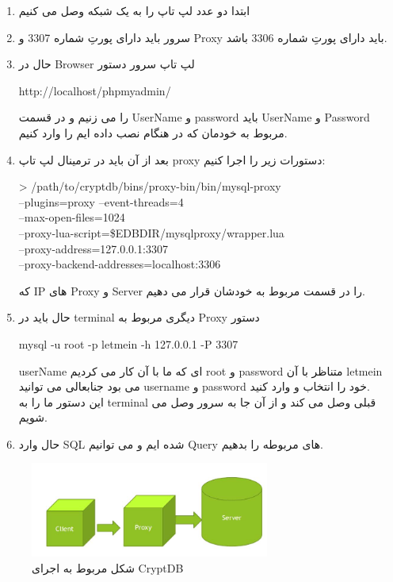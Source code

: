 \documentclass[a4paper]{article}
\begin{document}
			\begin{enumerate}
				\item
				ابتدا دو عدد لپ تاپ را به یک شبکه وصل می کنیم 
				\item
				سرور باید دارای پورتِ شماره 3307 و 
				Proxy
				باید دارای پورتِ شماره 3306 باشد.
				\item
				حال در
				Browser 
				لپ تاپ سرور دستور
				\begin{latin}
					http://localhost/phpmyadmin/
				\end{latin}
				را می زنیم و در قسمت UserName و password باید UserName و Password مربوط به خودمان که در هنگام نصب داده ایم را وارد کنیم.
				\item
				بعد از آن باید در ترمینال لپ تاپ
				proxy
				دستورات زیر را اجرا کنیم:
				\begin{latin}
					> /path/to/cryptdb/bins/proxy-bin/bin/mysql-proxy         \ \\
					--plugins=proxy --event-threads=4             \ \\	--max-open-files=1024                         \ \\
					--proxy-lua-script=\$EDBDIR/mysqlproxy/wrapper.lua \ \\
					--proxy-address=127.0.0.1:3307                \ \\
					--proxy-backend-addresses=localhost:3306
					
					
				\end{latin}
			
			
			که 
			IP
			های 
			Proxy
			و
			Server
			را در قسمت مربوط به خودشان قرار می دهیم.
			\item
			حال باید در 
			terminal
			دیگری مربوط به Proxy
			دستور
			\begin{latin}
				mysql -u root -p letmein -h 127.0.0.1 -P 3307
				
			\end{latin}
			userName 
			ای که ما با آن کار می کردیم root و 
			password
			متناظر با آن 
			letmein
			می بود جنابعالی می توانید username 
			و
			password
			خود را انتخاب و وارد کنید.\\
			این دستور ما را به  
			terminal 
			قبلی وصل می کند و از آن جا به سرور وصل می شویم.
			\item
			حال وارد 
			SQL
			شده ایم و می توانیم  
			Query
			های مربوطه را بدهیم.
			
			
		\end{enumerate}
		
		\begin{figure}[h]
			\centering
			\includegraphics[width=0.7\textwidth]{im7.jpg}
			\caption{شکل مربوط به اجرای CryptDB}
		\end{figure}
		
\end{document}
